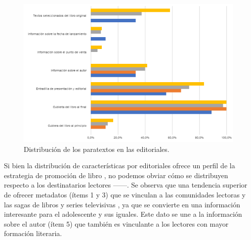 \documentclass[spanish]{textolivre}
\begin{document}
\begin{figure}[htbp]
\centering
\begin{minipage}{.8\textwidth}
 \includegraphics[width=\textwidth]{figure02.png}
 \caption{Distribución de los paratextos en las editoriales.}
 \label{fig02}
\end{minipage}
\end{figure}

Si bien la distribución de características por editoriales ofrece un perfil de la estrategia de promoción de libro \cite{landow2015bueno}, no podemos obviar cómo se distribuyen respecto a los destinatarios lectores ——. Se observa que una tendencia superior de ofrecer metadatos (ítems 1 y 3) que se vinculan a las comunidades lectoras y las sagas de libros y series televisivas \cite{rovira022evolucion}, ya que se convierte en una información interesante para el adolescente y sus iguales. Este dato se une a la información sobre el autor (ítem 5) que también es vinculante a los lectores con mayor formación literaria.  
\end{document}
